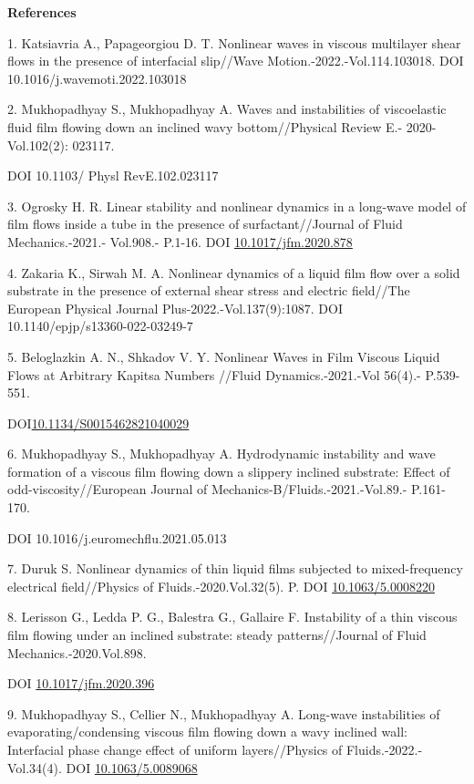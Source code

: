 \begin{center}
{\bfseries References}
\end{center}

\begin{references}
1. Katsiavria A., Papageorgiou D. T. Nonlinear waves in viscous
multilayer shear flows in the presence of interfacial slip//Wave
Motion.-2022.-Vol.114.103018. DOI 10.1016/j.wavemoti.2022.103018

2. Mukhopadhyay S., Mukhopadhyay A. Waves and instabilities of
viscoelastic fluid film flowing down an inclined wavy bottom//Physical
Review E.- 2020-Vol.102(2): 023117.

DOI 10.1103/ Physl RevE.102.023117

3. Ogrosky H. R. Linear stability and nonlinear dynamics in a long-wave
model of film flows inside a tube in the presence of surfactant//Journal
of Fluid Mechanics.-2021.- Vol.908.- P.1-16. DOI
\href{https://doi.org/10.1017/jfm.2020.878}{10.1017/jfm.2020.878}

4. Zakaria K., Sirwah M. A. Nonlinear dynamics of a liquid film flow
over a solid substrate in the presence of external shear stress and
electric field//The European Physical Journal
Plus-2022.-Vol.137(9):1087. DOI 10.1140/epjp/s13360-022-03249-7

5. Beloglazkin A. N., Shkadov V. Y. Nonlinear Waves in Film Viscous
Liquid Flows at Arbitrary Kapitsa Numbers //Fluid Dynamics.-2021.-Vol
56(4).- P.539-551.

DOI\href{http://dx.doi.org/10.1134/S0015462821040029}{10.1134/S0015462821040029}

6. Mukhopadhyay S., Mukhopadhyay A. Hydrodynamic instability and wave
formation of a viscous film flowing down a slippery inclined substrate:
Effect of odd-viscosity//European Journal of
Mechanics-B/Fluids.-2021.-Vol.89.- P.161-170.

DOI 10.1016/j.euromechflu.2021.05.013

7. Duruk S. Nonlinear dynamics of thin liquid films subjected to
mixed-frequency electrical field//Physics of Fluids.-2020.Vol.32(5). P.
DOI \href{http://dx.doi.org/10.1063/5.0008220}{10.1063/5.0008220}

8. Lerisson G., Ledda P. G., Balestra G., Gallaire F. Instability of a
thin viscous film flowing under an inclined substrate: steady
patterns//Journal of Fluid Mechanics.-2020.Vol.898.

DOI \href{http://dx.doi.org/10.1017/jfm.2020.396}{10.1017/jfm.2020.396}

9. Mukhopadhyay S., Cellier N., Mukhopadhyay A. Long-wave instabilities
of evaporating/condensing viscous film flowing down a wavy inclined
wall: Interfacial phase change effect of uniform layers//Physics of
Fluids.-2022.-Vol.34(4). DOI
\href{http://dx.doi.org/10.1063/5.0089068}{10.1063/5.0089068}


\end{references}
